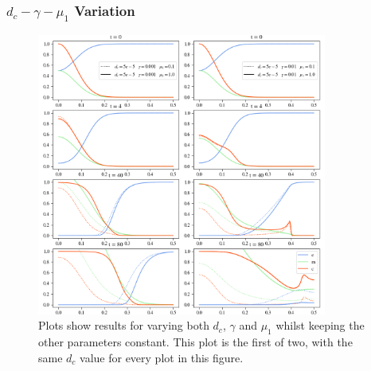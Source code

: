 \subsubsection*{$d_c - \gamma - \mu_1$ Variation}
\begin{figure}[h]
    \centering
    \includegraphics[width=0.85\textwidth]{resources/images/prolif_dc_gamma_mu1_1.png}
    \caption{Plots show results for varying both $d_c$, $\gamma$ and $\mu_1$ whilst keeping the other parameters constant. This plot is the first of two, with the same $d_c$ value for every plot in this figure.}
    \label{fig:prolif_dc_gamma_mu_1_variation_1}
\end{figure}

